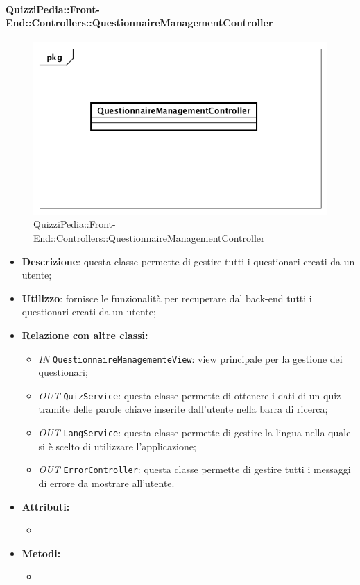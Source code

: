 \paragraph{QuizziPedia::Front-End::Controllers::QuestionnaireManagementController}
\begin{figure}
	\centering
	\includegraphics[scale=0.45]{UML/Classi/Front-End/QuizziPedia_Front-end_Controller_QuestionnaireManagementController.png}
	\caption{QuizziPedia::Front-End::Controllers::QuestionnaireManagementController}
\end{figure}
\begin{itemize}
	\item \textbf{Descrizione}: questa classe permette di gestire tutti i questionari creati da un utente; 
	\item \textbf{Utilizzo}: fornisce le funzionalità per recuperare dal back-end tutti i questionari creati da un utente;
	\item \textbf{Relazione con altre classi:}
	\begin{itemize}
		\item \textit{IN} \texttt{QuestionnaireManagementeView}: view principale per la gestione dei questionari;
		\item \textit{OUT} \texttt{QuizService}: questa classe permette di ottenere i dati di un quiz tramite delle parole chiave inserite dall'utente nella barra di ricerca;
		\item \textit{OUT} \texttt{LangService}: questa classe permette di gestire la lingua nella quale si è scelto di utilizzare l'applicazione;
		\item \textit{OUT} \texttt{ErrorController}: questa classe permette di gestire tutti i messaggi di errore da mostrare all'utente.
	\end{itemize}
	\item \textbf{Attributi:}
	\begin{itemize}
		\item 
	\end{itemize}
	\item \textbf{Metodi:}
	\begin{itemize}
		\item 
	\end{itemize}
\end{itemize}


